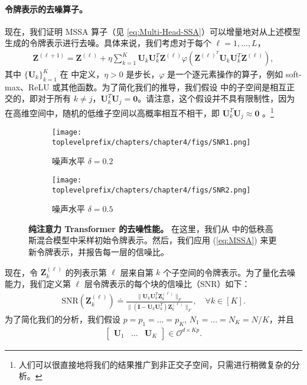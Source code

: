 \documentclass[../../book-main_zh.tex]{subfiles}
\begin{document}
\paragraph{令牌表示的去噪算子。} 现在，我们证明 MSSA 算子（见 \eqref{eq:Multi-Head-SSA}）可以增量地对从上述模型生成的令牌表示进行去噪。具体来说，我们考虑对于每个 $\ell =1 ,\dots,L$，
\begin{align}\label{eq:MSSA}
    \bm Z^{(\ell+1)} =  \bm Z^{(\ell)} + \eta \sum_{k=1}^K \bm U_k\bm U_k^T \bm Z^{(\ell)} \varphi \left(\bm Z^{(\ell)^T}\bm U_k\bm U_k^T\bm Z^{(\ell)} \right),
\end{align}
其中 $\{\bm U_k\}_{k=1}^K$ 在  中定义，$\eta > 0$ 是步长，$\varphi$ 是一个逐元素操作的算子，例如 soft-max、ReLU 或其他函数。为了简化我们的推导，我们假设  中的子空间是相互正交的，即对于所有 $k \neq j$，$\bm U_k^T\bm U_j = \bm 0$。请注意，这个假设并不具有限制性，因为在高维空间中，随机的低维子空间以高概率相互不相干，即 $\bm U_k^T\bm U_j \approx \bm 0$ \citep{Wright-Ma-2021}。\footnote{人们可以很直接地将我们的结果推广到非正交子空间，只需进行稍微复杂的分析。}

\begin{figure}[t]
    \begin{subfigure}[t]{0.45\textwidth}
        \centering
        \texttt{[image: \\toplevelprefix/chapters/chapter4/figs/SNR1.png]}
        \caption{噪声水平 $\delta = 0.2$}
    \end{subfigure}
    \hfill
    \begin{subfigure}[t]{0.45\textwidth}
        \centering
        \texttt{[image: \\toplevelprefix/chapters/chapter4/figs/SNR2.png]}
        \caption{噪声水平 $\delta = 0.5$}
    \end{subfigure}
    \caption{{\bf 纯注意力 Transformer 的去噪性能。} 在这里，我们从  中的低秩高斯混合模型中采样初始令牌表示。然后，我们应用 (\ref{eq:MSSA}) 来更新令牌表示，并报告每一层的信噪比。}  \label{fig:MSSA}
\end{figure}


现在，令 $\bm Z_k^{(\ell)}$ 的列表示第 $\ell$ 层来自第 $k$ 个子空间的令牌表示。为了量化去噪能力，我们定义第 $\ell$ 层令牌表示的每个块的信噪比（SNR）如下：
\begin{align}\label{def:SNR}
\mathrm{SNR}(\bm Z_k^{(\ell)}) \doteq  \frac{\|\bm U_k\bm U_k^T\bm Z_k^{(\ell)} \|_F}{\|(\bm I - \bm U_k\bm U_k^T)\bm Z_k^{(\ell)} \|_F},\quad \forall k \in [K].
\end{align}
为了简化我们的分析，我们假设 $p=p_1=\dots=p_K$, $N_1=\dots=N_K=N/K$，并且
\begin{align}\label{eq:orth}
\begin{bmatrix}
\bm U_1 & \dots & \bm U_K
\end{bmatrix} \in \mathcal{O}^{d\times Kp}.
\end{align}
\end{document}
